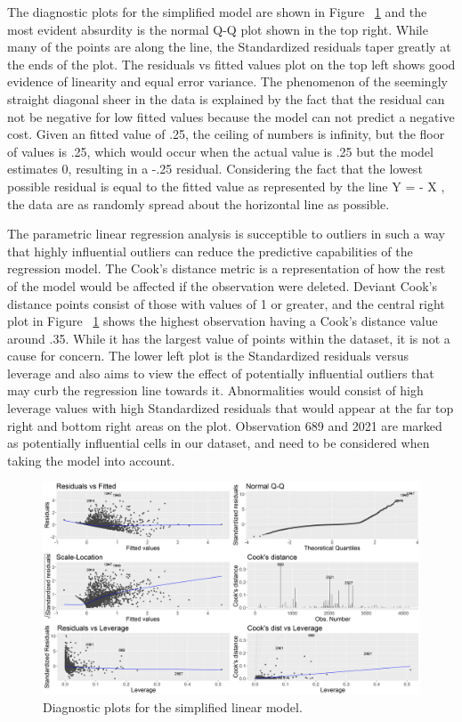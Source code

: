 \documentclass{llncs}
\begin{document}
The diagnostic plots for the simplified model are shown in Figure ~\ref{figure:Diags} and the most evident absurdity is the normal Q-Q plot shown in the top right. While many of the points are along the line, the Standardized residuals taper greatly at the ends of the plot. The residuals vs fitted values plot on the top left shows good evidence of linearity and equal error variance. The phenomenon of the seemingly straight diagonal sheer in the data is explained by the fact that the residual can not be negative for low fitted values because the model can not predict a negative cost. Given an fitted value of .25, the ceiling of numbers is infinity, but the floor of values is .25, which would occur when the actual value is .25 but the model estimates 0, resulting in a -.25 residual. Considering the fact that the lowest possible residual is equal to the fitted value as represented by the line Y = - X , the data are as randomly spread about the horizontal line as possible. 

The parametric linear regression analysis is succeptible to outliers in such a way that highly influential outliers can reduce the predictive capabilities of the regression model. The Cook's distance metric is a representation of how the rest of the model would be affected if the observation were deleted. Deviant Cook's distance points consist of those with values of 1 or greater, and the central right plot in Figure ~\ref{figure:Diags} shows the highest observation having a Cook's distance value around .35. While it has the largest value of points within the dataset, it is not a cause for concern. The lower left plot is the Standardized residuals versus leverage and also aims to view the effect of potentially influential outliers that may curb the regression line towards it. Abnormalities would consist of high leverage values with high Standardized residuals that would appear at the far top right and bottom right areas on the plot. Observation 689 and 2021 are marked as potentially influential cells in our dataset, and need to be considered when taking the model into account.

\FloatBarrier
\begin{figure}
 	\includegraphics[width=\textwidth, height=\textheight, keepaspectratio]{000LinearModelReducedDiagnostics.png}
 	\caption{Diagnostic plots for the simplified linear model.}
	\label{figure:Diags}

\end{figure}
\FloatBarrier
\end{document}
